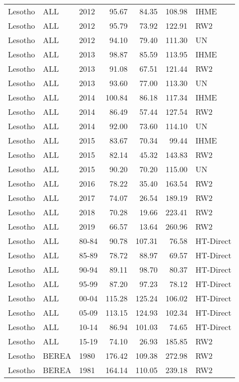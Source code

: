 \begin{longtable}{lllrrrl}
  Lesotho & ALL & 2012 & 95.67 & 84.35 & 108.98 & IHME \\ 
  Lesotho & ALL & 2012 & 95.79 & 73.92 & 122.91 & RW2 \\ 
  Lesotho & ALL & 2012 & 94.10 & 79.40 & 111.30 & UN \\ 
  Lesotho & ALL & 2013 & 98.87 & 85.59 & 113.95 & IHME \\ 
  Lesotho & ALL & 2013 & 91.08 & 67.51 & 121.44 & RW2 \\ 
  Lesotho & ALL & 2013 & 93.60 & 77.00 & 113.30 & UN \\ 
  Lesotho & ALL & 2014 & 100.84 & 86.18 & 117.34 & IHME \\ 
  Lesotho & ALL & 2014 & 86.49 & 57.44 & 127.54 & RW2 \\ 
  Lesotho & ALL & 2014 & 92.00 & 73.60 & 114.10 & UN \\ 
  Lesotho & ALL & 2015 & 83.67 & 70.34 & 99.44 & IHME \\ 
  Lesotho & ALL & 2015 & 82.14 & 45.32 & 143.83 & RW2 \\ 
  Lesotho & ALL & 2015 & 90.20 & 70.20 & 115.00 & UN \\ 
  Lesotho & ALL & 2016 & 78.22 & 35.40 & 163.54 & RW2 \\ 
  Lesotho & ALL & 2017 & 74.07 & 26.54 & 189.19 & RW2 \\ 
  Lesotho & ALL & 2018 & 70.28 & 19.66 & 223.41 & RW2 \\ 
  Lesotho & ALL & 2019 & 66.57 & 13.64 & 260.96 & RW2 \\ 
  Lesotho & ALL & 80-84 & 90.78 & 107.31 & 76.58 & HT-Direct \\ 
  Lesotho & ALL & 85-89 & 78.72 & 88.97 & 69.57 & HT-Direct \\ 
  Lesotho & ALL & 90-94 & 89.11 & 98.70 & 80.37 & HT-Direct \\ 
  Lesotho & ALL & 95-99 & 87.20 & 97.23 & 78.12 & HT-Direct \\ 
  Lesotho & ALL & 00-04 & 115.28 & 125.24 & 106.02 & HT-Direct \\ 
  Lesotho & ALL & 05-09 & 113.15 & 124.93 & 102.34 & HT-Direct \\ 
  Lesotho & ALL & 10-14 & 86.94 & 101.03 & 74.65 & HT-Direct \\ 
  Lesotho & ALL & 15-19 & 74.10 & 26.93 & 185.85 & RW2 \\ 
  Lesotho & BEREA & 1980 & 176.42 & 109.38 & 272.98 & RW2 \\ 
  Lesotho & BEREA & 1981 & 164.14 & 110.05 & 239.18 & RW2 \\ 

\end{longtable}
